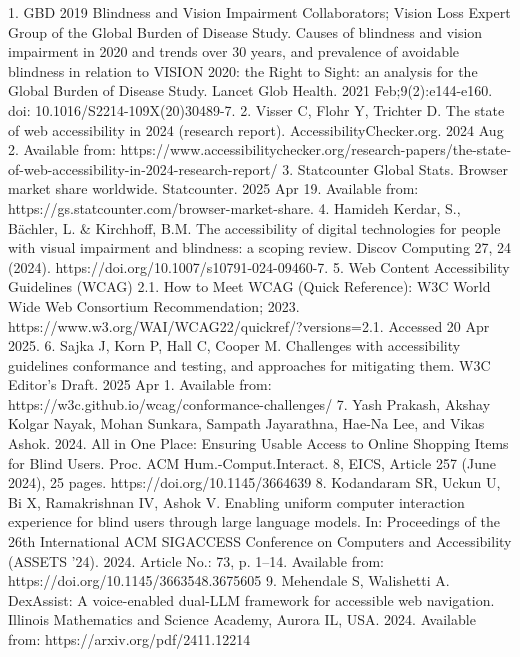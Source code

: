 \begin{thebibliography}{00}
1. GBD 2019 Blindness and Vision Impairment Collaborators; Vision Loss Expert Group of the Global Burden of Disease Study. Causes of blindness and vision impairment in 2020 and trends over 30 years, and prevalence of avoidable blindness in relation to VISION 2020: the Right to Sight: an analysis for the Global Burden of Disease Study. Lancet Glob Health. 2021 Feb;9(2):e144-e160. doi: 10.1016/S2214-109X(20)30489-7.
2. Visser C, Flohr Y, Trichter D. The state of web accessibility in 2024 (research report). AccessibilityChecker.org. 2024 Aug 2. Available from: https://www.accessibilitychecker.org/research-papers/the-state-of-web-accessibility-in-2024-research-report/
3. Statcounter Global Stats. Browser market share worldwide. Statcounter. 2025 Apr 19. Available from: https://gs.statcounter.com/browser-market-share.
4. Hamideh Kerdar, S., Bächler, L. \& Kirchhoff, B.M. The accessibility of digital technologies for people with visual impairment and blindness: a scoping review. Discov Computing 27, 24 (2024). https://doi.org/10.1007/s10791-024-09460-7.
5. Web Content Accessibility Guidelines (WCAG) 2.1. How to Meet WCAG (Quick Reference): W3C World Wide Web Consortium Recommendation; 2023. https://www.w3.org/WAI/WCAG22/quickref/?versions=2.1. Accessed 20 Apr 2025.
6. Sajka J, Korn P, Hall C, Cooper M. Challenges with accessibility guidelines conformance and testing, and approaches for mitigating them. W3C Editor's Draft. 2025 Apr 1. Available from: https://w3c.github.io/wcag/conformance-challenges/
7. Yash Prakash, Akshay Kolgar Nayak, Mohan Sunkara, Sampath Jayarathna, Hae-Na Lee, and Vikas Ashok. 2024. All in One Place: Ensuring Usable Access to Online Shopping Items for Blind Users. Proc. ACM Hum.-Comput.Interact. 8, EICS, Article 257 (June 2024), 25 pages. https://doi.org/10.1145/3664639
8. Kodandaram SR, Uckun U, Bi X, Ramakrishnan IV, Ashok V. Enabling uniform computer interaction experience for blind users through large language models. In: Proceedings of the 26th International ACM SIGACCESS Conference on Computers and Accessibility (ASSETS '24). 2024. Article No.: 73, p. 1–14. Available from: https://doi.org/10.1145/3663548.3675605
9. Mehendale S, Walishetti A. DexAssist: A voice-enabled dual-LLM framework for accessible web navigation. Illinois Mathematics and Science Academy, Aurora IL, USA. 2024. Available from: https://arxiv.org/pdf/2411.12214
\end{thebibliography}